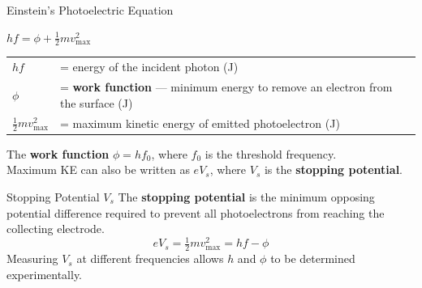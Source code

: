 \vspace{0.5em}
\begin{center}
\end{center}

\begin{formulabox}{Einstein's Photoelectric Equation}
\begin{center}
\Large $hf = \phi + \tfrac{1}{2}mv^2_{\max}$
\end{center}
\vspace{0.3em}
\begin{tabular}{@{}ll@{}}
$hf$ & = energy of the incident photon (J) \\
$\phi$ & = \textbf{work function} — minimum energy to remove an electron from the surface (J) \\
$\tfrac{1}{2}mv^2_{\max}$ & = maximum kinetic energy of emitted photoelectron (J) \\
\end{tabular}
\vspace{0.5em}

The \textbf{work function} $\phi = hf_0$, where $f_0$ is the threshold frequency.\\
Maximum KE can also be written as $eV_s$, where $V_s$ is the \textbf{stopping potential}.
\end{formulabox}

\begin{definitionbox}{Stopping Potential $V_s$}
The \textbf{stopping potential} is the minimum opposing potential difference required to prevent all photoelectrons from reaching the collecting electrode.
$$eV_s = \tfrac{1}{2}mv^2_{\max} = hf - \phi$$
Measuring $V_s$ at different frequencies allows $h$ and $\phi$ to be determined experimentally.
\end{definitionbox}

